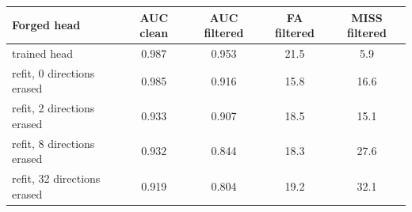 \begin{tabular}{@{}lcccc@{}}
\toprule
Forged head & AUC clean & AUC filtered & FA filtered & MISS filtered \\
\midrule
trained head & 0.987 & 0.953 & 21.5 & 5.9 \\
refit, 0 directions erased & 0.985 & 0.916 & 15.8 & 16.6 \\
refit, 2 directions erased & 0.933 & 0.907 & 18.5 & 15.1 \\
refit, 8 directions erased & 0.932 & 0.844 & 18.3 & 27.6 \\
refit, 32 directions erased & 0.919 & 0.804 & 19.2 & 32.1 \\
\bottomrule
\end{tabular}
